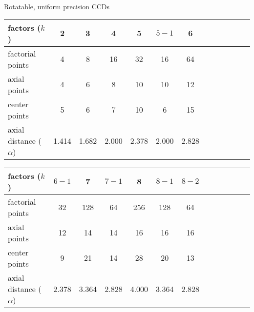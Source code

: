 \documentclass[9pt]{beamer}
\begin{document}
\begin{frame}{Rotatable, uniform precision CCDs}
	\begin{tabular}{lcccccccccccc}
	  factors ($k$) & 2 & 3 & 4 & 5 & $5-1$ & 6 \\
	  \hline
	  factorial points & 4 & 8 & 16 & 32 & 16 & 64 \\
	  axial points & 4 & 6 & 8 & 10 & 10 & 12 \\
	  center points & 5 & 6 & 7 & 10 & 6 & 15 \\
	  axial distance ($\alpha$) & 1.414 & 1.682 & 2.000 & 2.378 & 2.000 & 2.828
	\end{tabular}

	\bigskip\bigskip
	\begin{tabular}{lcccccccccccc}
	  factors ($k$) & $6-1$ & 7 & $7-1$ & 8 & $8-1$ & $8-2$ \\
	  \hline
	  factorial points & 32 & 128 & 64 & 256 & 128 & 64 \\
	  axial points & 12 & 14 & 14 & 16 & 16 & 16 \\
	  center points & 9 & 21 & 14 & 28 & 20 & 13 \\
	  axial distance ($\alpha$) & 2.378 & 3.364 & 2.828 & 4.000 & 3.364 & 2.828
	\end{tabular}
\end{frame}
\end{document}
